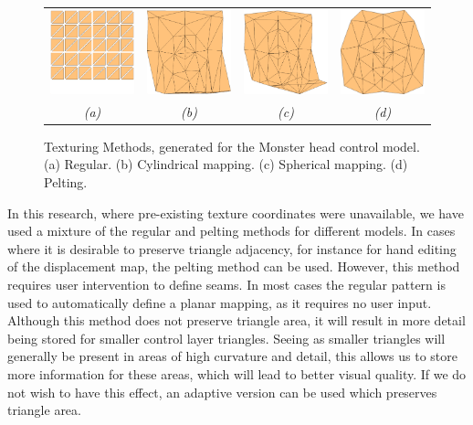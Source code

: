 \begin{figure}
\begin{center}
\begin{tabular}{cccc}
\includegraphics[width=3.2cm]{../images/texcoord_reg} &
\includegraphics[width=3.2cm]{../images/texcoord_cyl} &
\includegraphics[width=3.2cm]{../images/texcoord_sph} &
\includegraphics[width=3.2cm]{../images/texcoord_plt} \\
{\it (a)} & {\it (b)} & {\it (c)} & {\it (d)}
\end{tabular}
\caption[Texturing Methods]{\label{fig:texcoords} Texturing Methods, generated for the Monster head control model. (a) Regular. (b) Cylindrical mapping. (c) Spherical mapping. (d) Pelting.}
\end{center}
\end{figure}

In this research, where pre-existing texture coordinates were unavailable, we have used a mixture of the regular and pelting methods for different models. In cases where it is desirable to preserve triangle adjacency, for instance for hand editing of the displacement map, the pelting method can be used. However, this method requires user intervention to define seams. In most cases the regular pattern is used to automatically define a planar mapping, as it requires no user input. Although this method does not preserve triangle area, it will result in more detail being stored for smaller control layer triangles. Seeing as smaller triangles will generally be present in areas of high curvature and detail, this allows us to store more information for these areas, which will lead to better visual quality. If we do not wish to have this effect, an adaptive version can be used which preserves triangle area.

